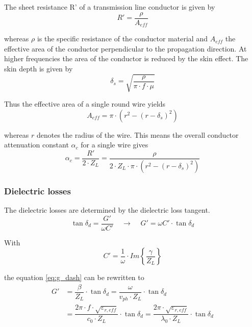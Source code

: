 The sheet resistance R' of a transmission line conductor is given by
\begin{equation}
R' = \dfrac{\rho}{A_{eff}}
\end{equation}

whereas $\rho$ is the specific resistance of the conductor material
and $A_{eff}$ the effective area of the conductor perpendicular to the
propagation direction.  At higher frequencies the area of the
conductor is reduced by the skin effect.  The skin depth is given by
\begin{equation}
\delta_s = \sqrt{\dfrac{\rho}{\pi\cdot f\cdot\mu}}
\end{equation}

Thus the effective area of a single round wire yields
\begin{equation}
A_{eff} = \pi\cdot\left(r^2 - (r-\delta_s)^2\right)
\end{equation}

whereas $r$ denotes the radius of the wire.  This means the overall
conductor attenuation constant $\alpha_c$ for a single wire gives
\begin{equation}
\alpha_c = \dfrac{R'}{2\cdot Z_L} = \dfrac{\rho}{2\cdot Z_L\cdot\pi\cdot\left(r^2 - (r-\delta_s)^2\right)}
\end{equation}

\subsubsection{Dielectric losses}

The dielectric losses are determined by the dielectric loss tangent.
\begin{equation}
\label{eq:g_dash}
\tan{ \delta_d } = \dfrac{G'}{\omega C'}
\;\;\;\; \rightarrow \;\;\;\;
G' = \omega C' \cdot \tan{ \delta_d }
\end{equation}

With
\begin{equation}
C' = \dfrac{1}{\omega}\cdot Im \left\{\dfrac{\gamma}{Z_L}\right\}
\end{equation}

the equation \eqref{eq:g_dash} can be rewritten to
\begin{equation}
\begin{split}
G' &= \dfrac{\beta}{Z_L}\cdot \tan{ \delta_d } = \dfrac{\omega}{v_{ph}\cdot Z_L}\cdot \tan{ \delta_d } \\
&= \dfrac{2\pi\cdot f\cdot \sqrt{\varepsilon_{r,eff}}}{c_0\cdot Z_L}\cdot \tan{ \delta_d } = \dfrac{2\pi\cdot \sqrt{\varepsilon_{r,eff}}}{\lambda_0\cdot Z_L}\cdot \tan{ \delta_d }
\end{split}
\end{equation}

